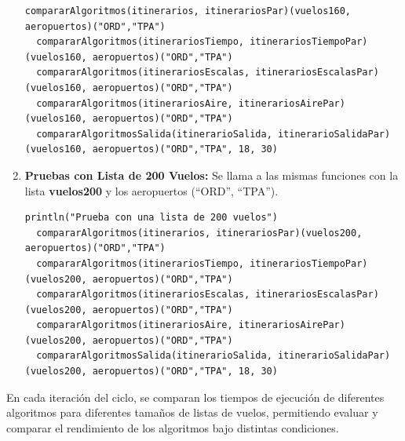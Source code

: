 \documentclass[letterpaper]{article}
\begin{document}
\begin{enumerate}
\begin{lstlisting}[caption={}, label={lst:lista160}, captionpos=b]
  compararAlgoritmos(itinerarios, itinerariosPar)(vuelos160, aeropuertos)("ORD","TPA")
  compararAlgoritmos(itinerariosTiempo, itinerariosTiempoPar)(vuelos160, aeropuertos)("ORD","TPA")
  compararAlgoritmos(itinerariosEscalas, itinerariosEscalasPar)(vuelos160, aeropuertos)("ORD","TPA")
  compararAlgoritmos(itinerariosAire, itinerariosAirePar)(vuelos160, aeropuertos)("ORD","TPA")
  compararAlgoritmosSalida(itinerarioSalida, itinerarioSalidaPar)(vuelos160, aeropuertos)("ORD","TPA", 18, 30)
  \end{lstlisting}
  \item \textbf{Pruebas con Lista de 200 Vuelos:} Se llama a las mismas funciones con la lista \textbf{vuelos200} y los aeropuertos (``ORD'', ``TPA'').
  \begin{lstlisting}[caption={}, label={lst:lista200}, captionpos=b]
  println("Prueba con una lista de 200 vuelos")
  compararAlgoritmos(itinerarios, itinerariosPar)(vuelos200, aeropuertos)("ORD","TPA")
  compararAlgoritmos(itinerariosTiempo, itinerariosTiempoPar)(vuelos200, aeropuertos)("ORD","TPA")
  compararAlgoritmos(itinerariosEscalas, itinerariosEscalasPar)(vuelos200, aeropuertos)("ORD","TPA")
  compararAlgoritmos(itinerariosAire, itinerariosAirePar)(vuelos200, aeropuertos)("ORD","TPA")
  compararAlgoritmosSalida(itinerarioSalida, itinerarioSalidaPar)(vuelos200, aeropuertos)("ORD","TPA", 18, 30)
  \end{lstlisting}
\end{enumerate}

En cada iteración del ciclo, se comparan los tiempos de ejecución de 
diferentes algoritmos para diferentes tamaños de listas de vuelos, 
permitiendo evaluar y comparar el rendimiento de los algoritmos 
bajo distintas condiciones.
\end{document}
